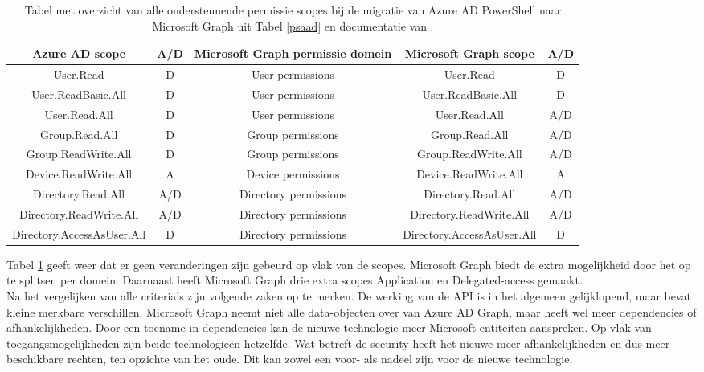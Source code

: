 \begin{table}[h]
    \centering
    \begin{adjustbox}{max width=\textwidth}
    \begin{tabular}{ |c|c||c|c|c| } 
        \hline
        \textbf{Azure AD scope} & \textbf{A/D} & \textbf{Microsoft Graph permissie domein} & \textbf{Microsoft Graph scope} & \textbf{A/D} \\
        \hline
        User.Read & D & User permissions & User.Read & D \\
        User.ReadBasic.All & D & User permissions & User.ReadBasic.All & D \\
        User.Read.All & D & User permissions & User.Read.All & A/D \\
        Group.Read.All & D & Group permissions & Group.Read.All & A/D \\
        Group.ReadWrite.All & D & Group permissions & Group.ReadWrite.All & A/D \\
        Device.ReadWrite.All & A & Device permissions & Device.ReadWrite.All & A \\
        Directory.Read.All & A/D & Directory permissions & Directory.Read.All & A/D \\
        Directory.ReadWrite.All & A/D & Directory permissions & Directory.ReadWrite.All & A/D \\
        Directory.AccessAsUser.All & D & Directory permissions & Directory.AccessAsUser.All & D \\ 
        \hline
    \end{tabular}
    \end{adjustbox}
    \caption[Tabel migratie Azure AD permissie scopes naar Microsoft Graph]{Tabel met overzicht van alle ondersteunende permissie scopes bij de migratie van Azure \ac{AD} PowerShell naar Microsoft Graph uit Tabel \ref{psaad} en documentatie van \textcite{Microsoft2023p}.}
    \label{AADMSGPS}
\end{table}

Tabel \ref{AADMSGPS} geeft weer dat er geen veranderingen zijn gebeurd op vlak van de scopes. Microsoft Graph biedt de extra mogelijkheid door het op te splitsen per domein. Daarnaast heeft Microsoft Graph drie extra scopes Application en Delegated-access gemaakt. \\

Na het vergelijken van alle criteria's zijn volgende zaken op te merken. De werking van de \Ac{API} is in het algemeen gelijklopend, maar bevat kleine merkbare verschillen. Microsoft Graph neemt niet alle data-objecten over van Azure \ac{AD} Graph, maar heeft wel meer dependencies of afhankelijkheden. Door een toename in dependencies kan de nieuwe technologie meer Microsoft-entiteiten aanspreken. Op vlak van toegangsmogelijkheden zijn beide technologieën hetzelfde. Wat betreft de security heeft het nieuwe meer afhankelijkheden en dus meer beschikbare rechten, ten opzichte van het oude. Dit kan zowel een voor- als nadeel zijn voor de nieuwe technologie.
